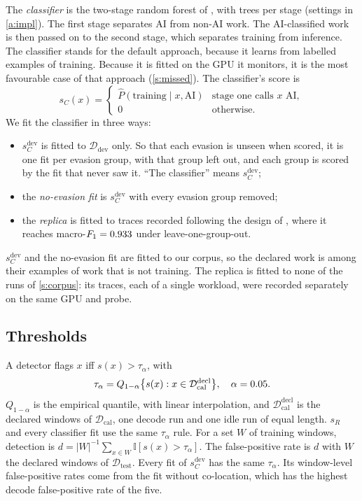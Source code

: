 The \emph{classifier} is the two-stage random forest of \citet{gargiulo2026}, with
\ForestTrees{} trees per stage (settings in \cref{a:impl}). The first stage separates AI from non-AI work. The AI-classified work is then passed on to the second stage, which separates training from inference. The classifier stands for the default approach, because it learns from labelled examples of training. Because it is fitted on the GPU it monitors, it is the most favourable case of that approach (\cref{s:missed}). The classifier's score is
\begin{equation}
  s_C(x) = \begin{cases}
    \hat P(\text{training} \mid x, \text{AI}) & \text{stage one calls } x \text{ AI},\\
    0 & \text{otherwise}.
  \end{cases}
\end{equation}
We fit the classifier in three ways:
\begin{itemize}
  \item $s_C^{\mathrm{dev}}$ is fitted to $\mathcal{D}_{\mathrm{dev}}$ only. So that each
        evasion is unseen when scored, it is one fit per evasion group, with that
        group left out, and each group is scored by the fit that never saw it.
        ``The classifier'' means $s_C^{\mathrm{dev}}$;
  \item the \emph{no-evasion fit} is $s_C^{\mathrm{dev}}$ with every evasion group
        removed;
  \item the \emph{replica} is fitted to \NRepTraces{} traces
        recorded following the design of \citet{gargiulo2026}, where it reaches
        macro-$F_1 = 0.933$ under leave-one-group-out.
\end{itemize}
$s_C^{\mathrm{dev}}$ and the no-evasion fit are fitted to our corpus, so the declared
work is among their examples of work that is not training. The replica is fitted to
none of the \NCaptures{} runs of \cref{s:corpus}: its traces, each of a single workload, were recorded separately on the
same GPU and probe.

\subsection{Thresholds}
A detector flags $x$ iff $s(x) > \tau_\alpha$, with
\begin{equation}\label{e:tau}
  \tau_\alpha = Q_{1-\alpha}\bigl\{ s(x) : x \in \mathcal{D}_{\mathrm{cal}}^{\mathrm{decl}} \bigr\}, \quad \alpha = 0.05.
\end{equation}
$Q_{1-\alpha}$ is the empirical quantile, with linear interpolation, and
$\mathcal{D}_{\mathrm{cal}}^{\mathrm{decl}}$ is the declared windows of
$\mathcal{D}_{\mathrm{cal}}$, one decode run and one idle run of equal length. $s_R$ and every
classifier fit use the same $\tau_\alpha$ rule. For a set $W$ of
training windows, detection is
$d = |W|^{-1} \sum_{x \in W} \mathbb{I}[s(x) > \tau_\alpha]$. The false-positive rate
is $d$ with $W$ the declared windows of $\mathcal{D}_{\mathrm{test}}$. Every fit of
$s_C^{\mathrm{dev}}$ has the same $\tau_\alpha$. Its window-level false-positive rates
come from the fit without co-location, which has the highest decode false-positive
rate of the five.

